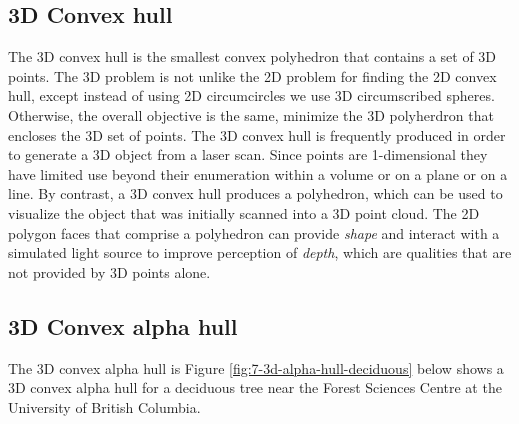 \documentclass[
]{book}
\begin{document}
\subsection{3D Convex hull}\label{d-convex-hull}

The 3D convex hull is the smallest convex polyhedron that contains a set of 3D points. The 3D problem is not unlike the 2D problem for finding the 2D convex hull, except instead of using 2D circumcircles we use 3D circumscribed spheres. Otherwise, the overall objective is the same, minimize the 3D polyherdron that encloses the 3D set of points. The 3D convex hull is frequently produced in order to generate a 3D object from a laser scan. Since points are 1-dimensional they have limited use beyond their enumeration within a volume or on a plane or on a line. By contrast, a 3D convex hull produces a polyhedron, which can be used to visualize the object that was initially scanned into a 3D point cloud. The 2D polygon faces that comprise a polyhedron can provide \emph{shape} and interact with a simulated light source to improve perception of \emph{depth}, which are qualities that are not provided by 3D points alone.

\subsection{3D Convex alpha hull}\label{d-convex-alpha-hull}

The 3D convex alpha hull is Figure \ref{fig:7-3d-alpha-hull-deciduous} below shows a 3D convex alpha hull for a deciduous tree near the Forest Sciences Centre at the University of British Columbia.
\end{document}
